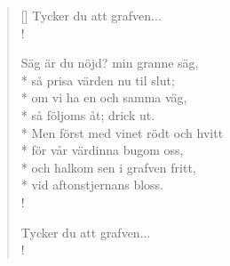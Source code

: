 \begin{verse}[\versewidth]
Tycker du att grafven...\\!

Säg är du nöjd? min granne säg,\\*
så prisa värden nu til slut;\\*
om vi ha en och samma väg,\\*
så följoms åt; drick ut.\\*
Men först med vinet rödt och hvitt\\*
för vår värdinna bugom oss,\\*
och halkom sen i grafven fritt,\\*
vid aftonstjernans bloss.\\!

Tycker du att grafven...\\!


\end{verse}

